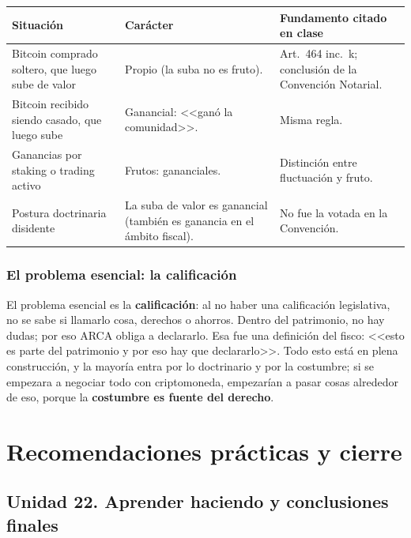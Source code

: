 \documentclass[12pt,oneside,a4paper]{book}
\begin{document}
\begin{longtable}{@{}>{\RaggedRight\arraybackslash}p{}>{\RaggedRight\arraybackslash}p{}>{\RaggedRight\arraybackslash}p{}@{}}
\toprule
\textbf{Situación} & \textbf{Carácter} & \textbf{Fundamento citado en clase} \\
\midrule
\endhead
Bitcoin comprado soltero, que luego sube de valor &
Propio (la suba no es fruto). &
Art.~464 inc.~k; conclusión de la Convención Notarial. \\
\addlinespace
Bitcoin recibido siendo casado, que luego sube &
Ganancial: <<ganó la comunidad>>. &
Misma regla. \\
\addlinespace
Ganancias por staking o trading activo &
Frutos: gananciales. &
Distinción entre fluctuación y fruto. \\
\addlinespace
Postura doctrinaria disidente &
La suba de valor es ganancial (también es ganancia en el ámbito fiscal). &
No fue la votada en la Convención. \\
\bottomrule
\end{longtable}

\subsection{El problema esencial: la calificación}

El problema esencial es la \textbf{calificación}: al no haber una calificación legislativa, no se sabe si llamarlo cosa, derechos o ahorros. Dentro del patrimonio, no hay dudas; por eso ARCA obliga a declararlo. Esa fue una definición del fisco: <<esto es parte del patrimonio y por eso hay que declararlo>>. Todo esto está en plena construcción, y la mayoría entra por lo doctrinario y por la costumbre; si se empezara a negociar todo con criptomoneda, empezarían a pasar cosas alrededor de eso, porque la \textbf{costumbre es fuente del derecho}.

\chapter{Recomendaciones prácticas y cierre}

\section{Unidad 22. Aprender haciendo y conclusiones finales}
\end{document}
